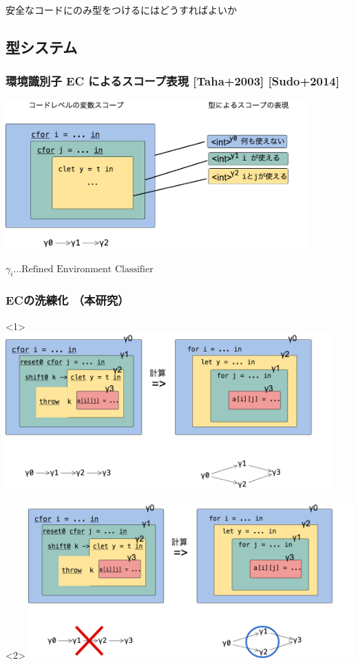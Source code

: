 \documentclass[dvipdfmx,cjk,xcolor=dvipsnames,envcountsect,notheorems,12pt]{beamer}
\theoremstyle{definition}
\begin{document}
\begin{frame}
  \center
  \huge{安全なコードにのみ型をつけるにはどうすればよいか}
\end{frame}

\subsection{型システム}

\begin{frame}
  \frametitle{環境識別子 EC によるスコープ表現 [Taha+2003] [Sudo+2014]}
  \begin{center}
    \includegraphics[clip,height=5.7cm]{../img/ec.png}
  \end{center}
  \begin{flushright}
    $\gamma_i ... \text{Refined Environment Classifier}$
  \end{flushright}
\end{frame}

\begin{frame}
  \frametitle{ECの洗練化 （本研究）}
  \begin{onlyenv}<1>
    \flushleft
    \includegraphics[clip,height=6cm]{../img/ecex1.png}
  \end{onlyenv}

  \begin{onlyenv}<2>
    \flushleft
    \includegraphics[clip,height=6cm]{../img/ecex.png}
  \end{onlyenv}
\end{frame}
\end{document}
